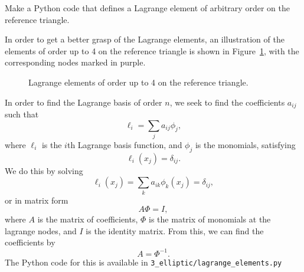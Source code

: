\begin{exercise}
    Make a Python code that defines a Lagrange element of arbitrary order on the reference triangle.
\end{exercise}

\begin{solution}
    In order to get a better grasp of the Lagrange elements, an illustration of the elements of order up to 4 on the reference triangle is shown in Figure~\ref{fig:lagrange_elements}, with the corresponding nodes marked in purple.

    \begin{figure}[!h]
        \centering
        
        \caption{Lagrange elements of order up to 4 on the reference triangle.\label{fig:lagrange_elements}}
    \end{figure}

    In order to find the Lagrange basis of order $n$, we seek to find the coefficients $a_{ij}$ such that
    \begin{equation*}
        \ell_i = \sum_{j} a_{ij} \phi_j,
    \end{equation*}
    where $\ell_i$ is the $i$th Lagrange basis function, and $\phi_j$ is the monomials, satisfying
    \begin{equation*}
        \ell_i(x_j) = \delta_{ij}.
    \end{equation*}
    We do this by solving
    \begin{equation*}
        \ell_i(x_j) = \sum_{k} a_{ik} \phi_k(x_j) = \delta_{ij},
    \end{equation*}
    or in matrix form
    \begin{equation*}
        A \Phi = I,
    \end{equation*}
    where $A$ is the matrix of coefficients, $\Phi$ is the matrix of monomials at the lagrange nodes, and $I$ is the identity matrix.
    From this, we can find the coefficients by
    \begin{equation*}
        A = \Phi^{-1}.
    \end{equation*}
    The Python code for this is available in \verb|3_elliptic/lagrange_elements.py|
\end{solution}